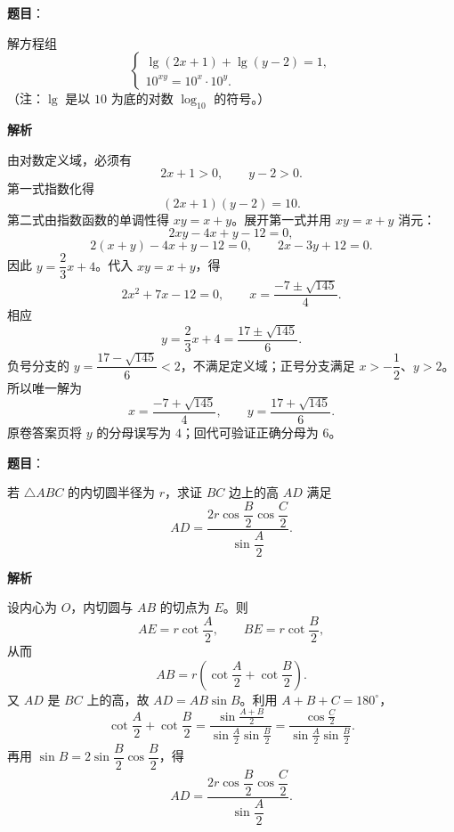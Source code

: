 \begin{answer}

\textbf{题目}：

解方程组
\nopagebreak[4]
\[
\begin{cases}
\lg(2x+1)+\lg(y-2)=1,\\
10^{xy}=10^x\cdot10^y.
\end{cases}
\]
（注：$\lg$ 是以 $10$ 为底的对数 $\log_{10}$ 的符号。）

\textbf{解析}

由对数定义域，必须有
\nopagebreak[4]
\[
2x+1>0,\qquad y-2>0.
\]
第一式指数化得
\nopagebreak[4]
\[
(2x+1)(y-2)=10.
\]
第二式由指数函数的单调性得 $xy=x+y$。展开第一式并用 $xy=x+y$ 消元：
\nopagebreak[4]
\[
2xy-4x+y-12=0,
\]
\nopagebreak[4]
\[
2(x+y)-4x+y-12=0,
\qquad 2x-3y+12=0.
\]
因此 $y=\dfrac23x+4$。代入 $xy=x+y$，得
\nopagebreak[4]
\[
2x^2+7x-12=0,
\qquad x=\frac{-7\pm\sqrt{145}}4.
\]
相应
\nopagebreak[4]
\[
y=\frac23x+4=\frac{17\pm\sqrt{145}}6.
\]
负号分支的 $y=\dfrac{17-\sqrt{145}}6<2$，不满足定义域；正号分支满足 $x>-\dfrac12$、$y>2$。所以唯一解为
\nopagebreak[4]
\[
x=\frac{-7+\sqrt{145}}4,\qquad y=\frac{17+\sqrt{145}}6.
\]
原卷答案页将 $y$ 的分母误写为 $4$；回代可验证正确分母为 $6$。


\end{answer}
\begin{answer}

\textbf{题目}：

若 $\triangle ABC$ 的内切圆半径为 $r$，求证 $BC$ 边上的高 $AD$ 满足
\nopagebreak[4]
\[
AD=\frac{2r\cos\dfrac B2\cos\dfrac C2}{\sin\dfrac A2}.
\]

\textbf{解析}
\nopagebreak[4]
\begin{center}\end{center}
\nopagebreak[4]
设内心为 $O$，内切圆与 $AB$ 的切点为 $E$。则
\nopagebreak[4]
\[
AE=r\cot\frac A2,\qquad BE=r\cot\frac B2,
\]
从而
\nopagebreak[4]
\[
AB=r\left(\cot\frac A2+\cot\frac B2\right).
\]
又 $AD$ 是 $BC$ 上的高，故 $AD=AB\sin B$。利用 $A+B+C=180^\circ$，
\nopagebreak[4]
\[
\cot\frac A2+\cot\frac B2
=\frac{\sin\frac{A+B}{2}}{\sin\frac A2\sin\frac B2}
=\frac{\cos\frac C2}{\sin\frac A2\sin\frac B2}.
\]
再用 $\sin B=2\sin\dfrac B2\cos\dfrac B2$，得
\nopagebreak[4]
\[
AD=\frac{2r\cos\dfrac B2\cos\dfrac C2}{\sin\dfrac A2}.
\]


\end{answer}
